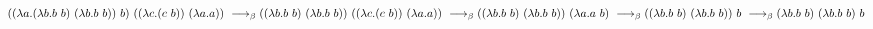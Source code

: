 \documentclass{article}
\begin{document}
$\\
((\lambda a.(\lambda b.b\ b)\ (\lambda b.b\ b))\ b)\ ((\lambda c.(c\ b))\ (\lambda a.a)) \ \longrightarrow_\beta \\
((\lambda b.b\ b)\ (\lambda b.b\ b))\ ((\lambda c.(c\ b))\ (\lambda a.a)) \ \longrightarrow_\beta \\
((\lambda b.b\ b)\ (\lambda b.b\ b))\ (\lambda a.a\ b) \ \longrightarrow_\beta \\
((\lambda b.b\ b)\ (\lambda b.b\ b))\ b \ \longrightarrow_\beta \\
(\lambda b.b\ b)\ (\lambda b.b\ b)\ b
$
\end{document}
